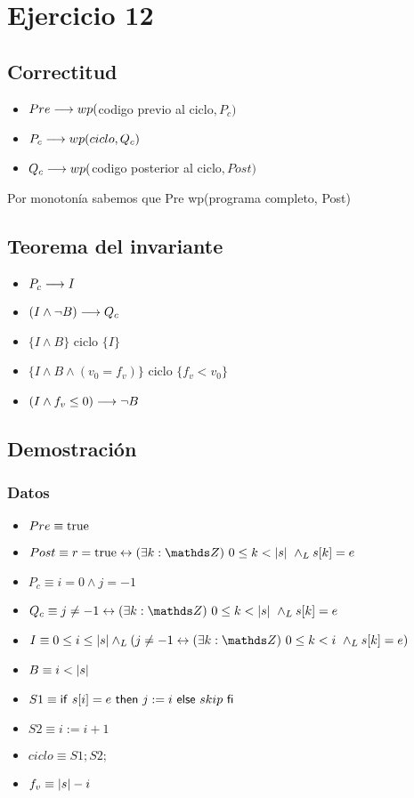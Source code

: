 \documentclass{article}
\begin{document}
\section*{Ejercicio 12}

\subsection*{Correctitud}
\begin{itemize}
    \item $Pre \longrightarrow wp($codigo previo al ciclo$, P_{c})$
    \item $P_{c} \longrightarrow wp(ciclo, Q_{c})$
    \item $Q_{c} \longrightarrow wp($codigo posterior al ciclo$, Post)$
\end{itemize}

Por monotonía sabemos que Pre \implica wp(programa completo, Post)

\subsection*{Teorema del invariante}
\begin{itemize}
    \item $P_{c} \longrightarrow I$
    \item $(I \wedge \neg B) \longrightarrow Q_{c}$
    \item $\{I \wedge B\}$ ciclo $\{ I \}$
    \item $\{I \wedge B \wedge (v_{0} = f_{v})\}$ ciclo $\{f_{v} < v_{0}\}$
    \item $(I \wedge f_{v} \leq 0) \longrightarrow \neg B$
\end{itemize}

\subsection*{Demostración}

\subsubsection*{Datos}
\begin{itemize}
    \item $Pre      \equiv \mathrm{true}$
    \item $Post     \equiv r = \True \Iff \existe{k}{0}{\longitud{s}} \yLuego s[k] = e$
    \item $P_{c}    \equiv i = 0 \wedge j = -1$
    \item $Q_{c}    \equiv j \neq -1 \Iff \existe{k}{0}{\longitud{s}} \yLuego s[k] = e$
    \item $I        \equiv 0 \leq i \leq \longitud{s} \yLuego (j \neq -1 \Iff \existe{k}{0}{i} \yLuego s[k] = e)$
    \item $B        \equiv i < |s|$
    \item $S1       \equiv \mathsf{if}\ s[i]=e\ \mathsf{then}\ j:=i\ \mathsf{else}\ skip\ \mathsf{fi}$
    \item $S2       \equiv i:= i + 1$
    \item $ciclo    \equiv S1;S2;$
    \item $f_{v}    \equiv |s| - i$
\end{itemize}
\end{document}
